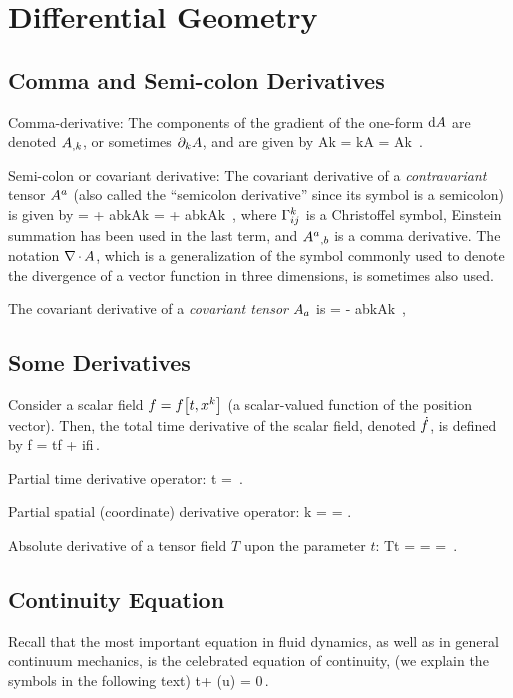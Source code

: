 \section{Differential Geometry}


\subsection{Comma and Semi-colon Derivatives}
Comma-derivative: The components of the gradient of the one-form $\dx A$ are denoted $\cder Ak$, or sometimes $\igder kA$, and are given by
\beq
\cder Ak = \igder kA = \xpd A{\scoord k} \,.
\eeq

Semi-colon or covariant derivative: The covariant derivative of a \emph{contravariant} tensor $\cntens Aa$ (also called the ``semicolon derivative'' since its symbol is a semicolon) is given by
\beq
{} =  + \chris abk\cntens Ak 
                      =  + \chris abk\cntens Ak \,,
\eeq
where $\chris kij$ is a Christoffel symbol, Einstein summation has been used in the last term, and $\cder{\cntens Aa}{b}$ is a comma derivative. The notation $\gder\iprod A$, which is a generalization of the symbol commonly used to denote the divergence of a vector function in three dimensions, is sometimes also used.

The covariant derivative of a \emph{covariant tensor} $\cotens Aa$ is
\beq
{} =  - \chris abk\cotens Ak \,,
\eeq


\subsection{Some Derivatives}
Consider a scalar field $f = f\vat{t, \scoord i}$ (a scalar-valued function of the position vector). Then, the total time derivative of the scalar field, denoted $\dt f$, is defined by 
\beq
\dt f = \igder tf + \igder if\dtcntens\pvec i\,.
\eeq

Partial time derivative operator:
\beq
\igder t = \,.
\eeq

Partial spatial (coordinate) derivative operator:
\beq
\igder k =  = .
\eeq

Absolute derivative of a tensor field $T$ upon the parameter $t$:
\beq
\mder Tt =  =  = \,.
\eeq


\subsection{Continuity Equation}
Recall that the most important equation in fluid dynamics, as well as in general continuum mechanics, is the celebrated equation of continuity, (we explain the symbols in the following text)
\beq
\igder t\rho + \div(\rho u) = 0\,.
\eeq

